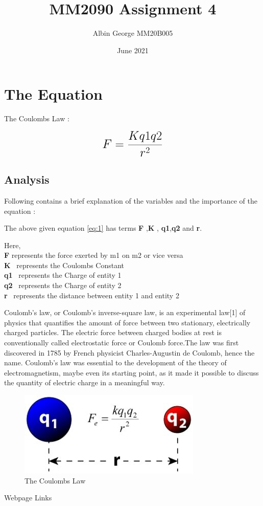 \documentclass[a4paper, 12pt]{article}
\begin{document}
\title{MM2090 Assignment 4}
\author{Albin George MM20B005}
\date{June 2021}
\maketitle

\section{The Equation}

The Coulombs Law  :  

\begin{equation}
 {\LARGE{\textbf{$F =\frac{Kq1q2}{{r^2}}$}}}
 \label{eqn:equation}
\end{equation}


\subsection{Analysis}
Following contains a brief explanation of the variables and the importance of the equation :
\begin{itemize}

    {\normalsize {The above given equation \ref{eq:1}  has terms \textbf{F} ,\textbf{K} , \textbf{q1},\textbf{q2} and \textbf{r}.}}

{\normalsize { Here,}}\\
{\normalsize {\textbf{F} represents the force exerted by m1 on m2 or vice versa }}\\
{\normalsize {\textbf{K} \  represents the Coulombs Constant}}\\
{\normalsize {\textbf{q1} \  represents the Charge of entity 1}}\\
{\normalsize {\textbf{q2} \  represents the Charge of entity 2}}\\
{\normalsize{\textbf{r} \ represents the distance between entity 1 and entity 2}}
\end{itemize}


Coulomb's law, or Coulomb's inverse-square law, is an experimental law[1] of physics that quantifies the amount of force between two stationary, electrically charged particles. The electric force between charged bodies at rest is conventionally called electrostatic force or Coulomb force.The law was first discovered in 1785 by French physicist Charles-Augustin de Coulomb, hence the name. Coulomb's law was essential to the development of the theory of electromagnetism, maybe even its starting point, as it made it possible to discuss the quantity of electric charge in a meaningful way.

\begin{figure}[h]
	{\begin{center}
		\includegraphics[scale=0.3]{MM20B005.jpg}
	\end{center}}
	\caption{The Coulombs Law\cite{picture}}
	\label{f1:image}
\end{figure}

Webpage Links \cite{website}



%
%
\end{document}
